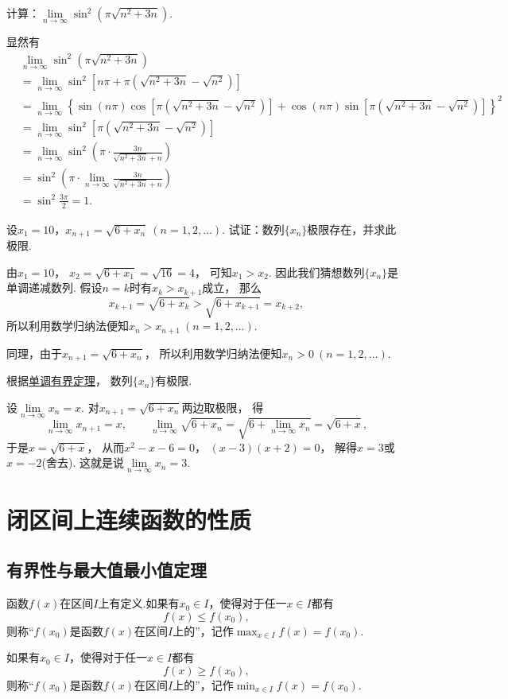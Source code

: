 \begin{example}
\def\l{\lim\limits_{n\to\infty}}
计算：\(\l \sin^2(\pi\sqrt{n^2+3n})\).
\begin{solution}
\def\a{\pi(\sqrt{n^2+3n}-\sqrt{n^2})}
显然有\begin{align*}
&\l \sin^2(\pi\sqrt{n^2+3n}) \\
&= \l \sin^2[n\pi+\a] \\
&= \l \left\{ \sin(n\pi) \cos\left[\a\right] + \cos(n\pi) \sin\left[\a\right] \right\}^2 \\
&= \l \sin^2\left[\a\right] \\
&= \l \sin^2\left( \pi \cdot \frac{3n}{\sqrt{n^2+3n}+n} \right) \\
&= \sin^2 \left( \pi \cdot \l \frac{3n}{\sqrt{n^2+3n}+n} \right) \\
&= \sin^2 \frac{3\pi}{2}
= 1.
\end{align*}
\end{solution}
\end{example}

\begin{example}
设\(x_1=10\)，\(x_{n+1}=\sqrt{6+x_n}\ (n=1,2,\dotsc)\).
试证：数列\(\{x_n\}\)极限存在，并求此极限.
\begin{solution}
由\(x_1=10\)，
\(x_2=\sqrt{6+x_1}=\sqrt{16}=4\)，
可知\(x_1>x_2\).
因此我们猜想数列\(\{x_n\}\)是单调递减数列.
假设\(n=k\)时有\(x_k>x_{k+1}\)成立，
那么\[
	x_{k+1}=\sqrt{6+x_k}>\sqrt{6+x_{k+1}}=x_{k+2},
\]
所以利用数学归纳法便知\(x_n>x_{n+1}\ (n=1,2,\dotsc)\).

同理，由于\(x_{n+1}=\sqrt{6+x_n}\)，
所以利用数学归纳法便知\(x_n>0\ (n=1,2,\dotsc)\).

根据\hyperref[theorem:极限.数列的单调有界定理]{单调有界定理}，
数列\(\{x_n\}\)有极限.

设\(\lim\limits_{n\to\infty}x_n=x\).
对\(x_{n+1}=\sqrt{6+x_n}\)两边取极限，
得\[
	\lim\limits_{n\to\infty}x_{n+1}=x, \qquad
	\lim\limits_{n\to\infty}\sqrt{6+x_n}
	=\sqrt{6+\lim\limits_{n\to\infty}x_n}
	=\sqrt{6+x},
\]
于是\(x=\sqrt{6+x}\)，
从而\(x^2-x-6=0\)，
\((x-3)(x+2)=0\)，
解得\(x=3\)或\(x=-2\)(舍去).
这就是说\(\lim\limits_{n\to\infty}x_n=3\).
\end{solution}
\end{example}

\section{闭区间上连续函数的性质}
\subsection{有界性与最大值最小值定理}
\begin{definition}
函数\(f(x)\)在区间\(I\)上有定义.如果有\(x_0 \in I\)，使得对于任一\(x \in I\)都有\[
f(x) \leq f(x_0),
\]则称“\(f(x_0)\)是函数\(f(x)\)在区间\(I\)上的”，记作\(\max_{x \in I}f(x) = f(x_0)\).

如果有\(x_0 \in I\)，使得对于任一\(x \in I\)都有\[
f(x) \geq f(x_0),
\]则称“\(f(x_0)\)是函数\(f(x)\)在区间\(I\)上的”，记作\(\min_{x \in I}f(x) = f(x_0)\).
\end{definition}

